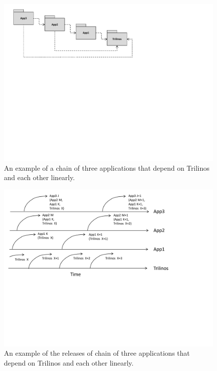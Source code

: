 \documentclass[11pt]{SANDreport}
\begin{document}
\begin{figure}[p]
\begin{center}
\includegraphics[trim = 0.2in 4.8in 3.6in 0.1in, scale=0.75]
{ThreeAppsDependingOnTrilinos}
{}\caption{An example of a chain of three applications that depend on
Trilinos and each other linearly.}
\label{fig:ThreeAppsDependingOnTrilinos}
\end{center}
\end{figure}

\begin{figure}[p]
\begin{center}
\includegraphics[trim = 0.2in 3.2in 2.2in 0.1in, scale=0.75]
{ThreeAppsDependingOnTrilinosReleases}
{}\caption{An example of the releases of chain of three applications
that depend on Trilinos and each other linearly.}
\label{fig:ThreeAppsDependingOnTrilinosReleases}
\end{center}
\end{figure}
\end{document}
